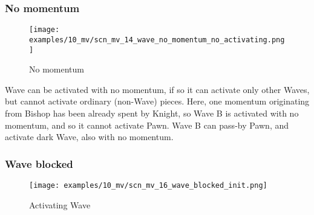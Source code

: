 

\clearpage %

\subsubsection*{No momentum}

\vspace*{-3.0ex}
\noindent
\begin{figure}[h]
\texttt{[image: examples/10\_mv/scn\_mv\_14\_wave\_no\_momentum\_no\_activating.png]}
\caption{No momentum}
\label{fig:scn_mv_14_wave_no_momentum_no_activating}
\end{figure}

Wave can be activated with no momentum, if so it can activate only other Waves, but
cannot activate ordinary (non-Wave) pieces. Here, one momentum originating from Bishop
has been already spent by Knight, so Wave B is activated with no momentum, and so it
cannot activate Pawn. Wave B can pass-by Pawn, and activate dark Wave, also with no
momentum.

\clearpage %

\subsubsection*{Wave blocked}

\vspace*{-3.0ex}
\noindent
\begin{figure}[h]
\texttt{[image: examples/10\_mv/scn\_mv\_16\_wave\_blocked\_init.png]}
\caption{Activating Wave}
\label{fig:scn_mv_16_wave_blocked_init}
\end{figure}

